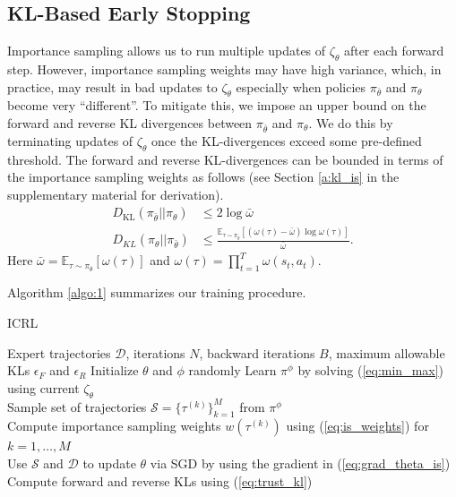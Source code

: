 \documentclass{article}
\begin{document}
\subsection{KL-Based Early Stopping}
Importance sampling allows us to run multiple updates of $\zeta_\theta$ after each forward step. However, importance sampling weights may have high variance, which, in practice, may result in bad updates to $\zeta_\theta$ especially when policies $\pi_{\bar\theta}$ and $\pi_{\theta}$ become very ``different''. To mitigate this, we impose an upper bound on the forward and reverse KL divergences between $\pi_{\bar\theta}$ and $\pi_\theta$. We do this by terminating updates of $\zeta_\theta$ once the KL-divergences exceed some pre-defined threshold. The forward and reverse KL-divergences can be bounded in terms of the importance sampling weights as follows (see Section \ref*{a:kl_is} in the supplementary material for derivation).
\begin{equation}
\begin{split}
    D_\text{KL}(\pi_{\bar\theta}\vert\vert\pi_\theta) &\leq 2\log \bar\omega\\
    D_{KL}(\pi_{\theta}\vert\vert\pi_{\bar\theta}) &\leq \frac{\mathbb{E}_{\tau\sim\pi_{\bar\theta}} \left[(\omega(\tau)-\bar\omega)\log\omega(\tau)\right]}{\bar{\omega}}.
\end{split}
    \label{eq:trust_kl}
\end{equation}
Here $\bar\omega = \mathbb{E}_{\tau\sim\pi_{\bar\theta}}\left[\omega(\tau)\right]$ and $\omega(\tau) = \prod_{t=1}^T\omega(s_t,a_t)$.

Algorithm \ref{algo:1} summarizes our training procedure.

\begin{algorithm}[t]
    \caption{ICRL}
    \label{algo:1}
    \begin{algorithmic}
         Expert trajectories $\mathcal{D}$, iterations $N$, backward iterations $B$, maximum allowable KLs $\epsilon_F$ and $\epsilon_R$ 
        \STATE Initialize $\theta$ and $\phi$ randomly
        \STATE Learn $\pi^\phi$ by solving (\ref{eq:min_max}) using current $\zeta_\theta$\\
        \STATE Sample set of trajectories $\mathcal{S} = \{\tau^{(k)}\}_{k=1}^M$ from $\pi^\phi$\\
        \STATE Compute importance sampling weights $w(\tau^{(k)})$ using (\ref{eq:is_weights}) for $k=1,\ldots,M$\\
        \STATE Use $\mathcal{S}$ and $\mathcal{D}$ to update $\theta$ via SGD by using the gradient in (\ref{eq:grad_theta_is})
        \STATE Compute forward and reverse KLs using (\ref{eq:trust_kl})
        \ENDIF
        \ENDFOR
        \ENDFOR
    \end{algorithmic}
\end{algorithm}
\end{document}
